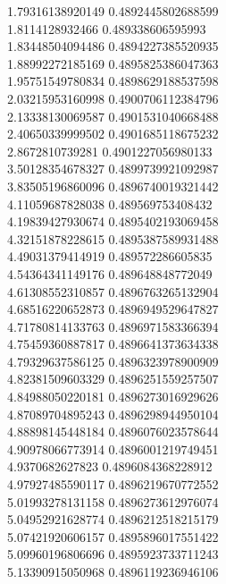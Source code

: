 {1.79316138920149 0.4892445802688599
 \\
1.8114128932466 0.489338606595993
 \\
1.83448504094486 0.4894227385520935
 \\
1.88992272185169 0.4895825386047363
 \\
1.95751549780834 0.4898629188537598
 \\
2.03215953160998 0.4900706112384796
 \\
2.13338130069587 0.4901531040668488
 \\
2.40650339999502 0.4901685118675232
 \\
2.8672810739281 0.4901227056980133
 \\
3.50128354678327 0.4899739921092987
 \\
3.83505196860096 0.4896740019321442
 \\
4.11059687828038 0.489569753408432
 \\
4.19839427930674 0.4895402193069458
 \\
4.32151878228615 0.4895387589931488
 \\
4.49031379414919 0.489572286605835
 \\
4.54364341149176 0.489648848772049
 \\
4.61308552310857 0.4896763265132904
 \\
4.68516220652873 0.4896949529647827
 \\
4.71780814133763 0.4896971583366394
 \\
4.75459360887817 0.4896641373634338
 \\
4.79329637586125 0.4896323978900909
 \\
4.82381509603329 0.4896251559257507
 \\
4.84988050220181 0.4896273016929626
 \\
4.87089704895243 0.4896298944950104
 \\
4.88898145448184 0.4896076023578644
 \\
4.90978066773914 0.4896001219749451
 \\
4.9370682627823 0.4896084368228912
 \\
4.97927485590117 0.4896219670772552
 \\
5.01993278131158 0.4896273612976074
 \\
5.04952921628774 0.4896212518215179
 \\
5.07421920606157 0.4895896017551422
 \\
5.09960196806696 0.4895923733711243
 \\
5.13390915050968 0.4896119236946106
 \\
}
